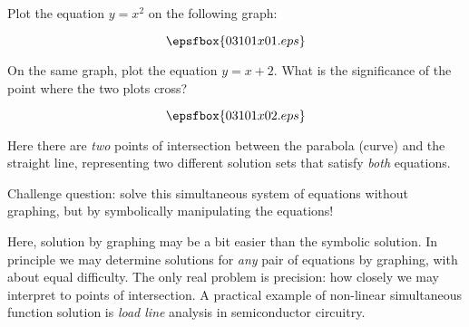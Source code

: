 

Plot the equation $y = x^2$ on the following graph:

$$\epsfbox{03101x01.eps}$$

On the same graph, plot the equation $y = x + 2$.  What is the significance of the point where the two plots cross?







$$\epsfbox{03101x02.eps}$$

Here there are {\it two} points of intersection between the parabola (curve) and the straight line, representing two different solution sets that satisfy {\it both} equations.

\vskip 10pt

Challenge question: solve this simultaneous system of equations without graphing, but by symbolically manipulating the equations!







Here, solution by graphing may be a bit easier than the symbolic solution.  In principle we may determine solutions for {\it any} pair of equations by graphing, with about equal difficulty.  The only real problem is precision: how closely we may interpret to points of intersection.  A practical example of non-linear simultaneous function solution is {\it load line} analysis in semiconductor circuitry.




